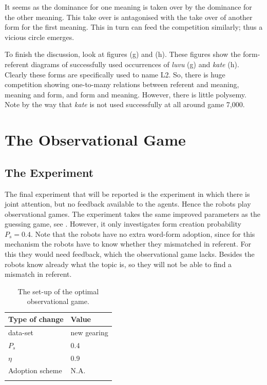 It seems as the dominance for one meaning is taken over by the dominance for the other meaning. This take over is antagonised with the take over of another form for the first meaning. This in turn can feed the competition similarly; thus a vicious circle emerges.


To finish the discussion, look at figures (g) and (h). These figures show the form-referent diagrams of successfully used occurrences of {\it luvu} (g) and {\it kate} (h). Clearly these forms are specifically used to name L2. So, there is huge competition showing one-to-many relations between referent and meaning, meaning and form, and form and meaning. However, there is little polysemy. Note by the way that {\it kate} is not used successfully at all around game 7,000.


\section{The Observational Game}\label{s:opt:oli}

\subsection{The Experiment}

The final experiment that will be reported is the experiment in which there is joint attention, but no feedback available to the agents. Hence the robots play observational games. The experiment takes the same improved parameters as the guessing game, see . However, it only investigates form creation probability $P_s=0.4$. Note that the robots have no extra word-form adoption, since for this mechanism the robots have to know whether they mismatched in referent. For this they would need feedback, which the observational game lacks. Besides the robots know already what the topic is, so they will not be able to find a mismatch in referent.

\begin{table}[t]
\centering
\begin{tabular}{ll}
\lsptoprule
Type of change & Value\\\midrule
data-set & new gearing\\%
$P_s$ & 0.4\\%
$\eta$ & 0.9\\%
Adoption scheme & N.A.\\%
\lspbottomrule
\end{tabular}
\caption{The set-up of the optimal observational game. }
\label{t:opt:oli}
\end{table}

